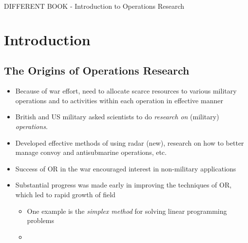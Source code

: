 \documentclass{article}
\begin{document}
%
%
%
%
%
%
\newpage
{\LARGE DIFFERENT BOOK - Introduction to Operations Research}
\setcounter{section}{0}
\section{Introduction}
\subsection{The Origins of Operations Research}
\begin{itemize}
\item Because of war effort, need to allocate scarce resources to various military operations and to activities within each operation in effective manner
\item British and US military asked scientists to do \textit{ research on } (military) \textit{ operations}.
\item Developed effective methods of using radar (new), research on how to better manage convoy and antisubmarine operations, etc.
\item Success of OR in the war encouraged interest in non-military applications
\item Substantial progress was made early in improving the techniques of OR, which led to rapid growth of field
	\begin{itemize}
	\item One example is the \textit{simplex method} for solving linear programming problems
    \item 
	\end{itemize}
\end{itemize}
\end{document}
